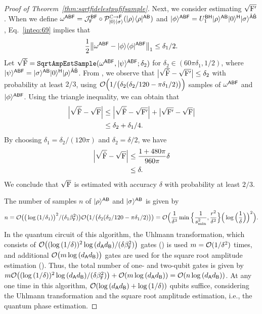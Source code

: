 \begin{proof}[Proof of Theorem~\ref{thm:sqrtfidelestpufifsample}]
Next, we consider estimating $\sqrt{{\mathrm{F}}'}$. When we define $\omega^{{\mathsf{A}}{\mathsf{B}}{\mathsf{F}}} = {\mathcal{J}}_{\mathtt{F}}^{{\mathsf{B}}{\mathsf{F}}}\circ{\mathcal{P}}_{|0\rangle|\sigma\rangle}^{\mathbb{C}\rightarrow{\mathsf{F}}}(|\rho\rangle\langle\rho|^{{\mathsf{A}}{\mathsf{B}}})$ and $|\phi\rangle^{{\mathsf{A}}{\mathsf{B}}{\mathsf{F}}} = U_1^{{\mathsf{B}}{\mathsf{H}}}|\rho\rangle^{{\mathsf{A}}{\mathsf{B}}}|0\rangle^{\mathsf{H}}|\sigma\rangle^{\hat{{\mathsf{A}}}\hat{{\mathsf{B}}}}$, Eq.~\eqref{inteq:69} implies that 
\begin{equation}
\label{eq:state error in FE}
    \frac{1}{2}\big\|\omega^{{\mathsf{A}}{\mathsf{B}}{\mathsf{F}}} - |\phi\rangle\langle\phi|^{{\mathsf{A}}{\mathsf{B}}{\mathsf{F}}}\big\|_1 \leq \delta_1/2. 
\end{equation} 
Let $\sqrt{\tilde{{\mathrm{F}}}} = \mathtt{SqrtAmpEstSample}(\omega^{{\mathsf{A}}{\mathsf{B}}{\mathsf{F}}}, |\psi\rangle^{{\mathsf{A}}{\mathsf{B}}{\mathsf{F}}}; \delta_2)$ for $\delta_2 \in (60\pi \delta_1, 1/2)$, where $|\psi\rangle^{{\mathsf{A}}{\mathsf{B}}{\mathsf{F}}} = |\sigma\rangle^{{\mathsf{A}}{\mathsf{B}}}|0\rangle^{\mathsf{H}}|\rho\rangle^{\hat{{\mathsf{A}}}\hat{{\mathsf{B}}}}$.
From , we observe that $\big|\sqrt{\tilde{{\mathrm{F}}}} - \sqrt{{\mathrm{F}}'}\big| \leq \delta_2$ with probability at least $2/3$, using ${\mathcal{O}}\Big(1/\big(\delta_2(\delta_2/120 - \pi \delta_1/2)\big)\Big)$ samples of $\omega^{{\mathsf{A}}{\mathsf{B}}{\mathsf{F}}}$ and $|\phi\rangle^{{\mathsf{A}}{\mathsf{B}}{\mathsf{F}}}$.
Using the triangle inequality, we can obtain that
\begin{align}
\label{inteq:72}
    \Big|\sqrt{\tilde{{\mathrm{F}}}} - \sqrt{{\mathrm{F}}}\Big| 
    &\leq \Big|\sqrt{\tilde{{\mathrm{F}}}} - \sqrt{{\mathrm{F}}'}\Big| + \big|\sqrt{{\mathrm{F}}'} - \sqrt{{\mathrm{F}}}\big| \\
    &\leq \delta_2 + \delta_1/4.
\end{align}
By choosing $\delta_1 = \delta_2/(120\pi)$ and $\delta_2 = \delta/2$, we have 
\begin{align}
    \Big|\sqrt{\tilde{{\mathrm{F}}}} - \sqrt{{\mathrm{F}}}\Big| 
    &\leq \frac{1 + 480\pi}{960\pi}\delta \\
    &\leq \delta.
\end{align}
We conclude that $\sqrt{{\mathrm{F}}}$ is estimated with accuracy $\delta$ with probability at least $2/3$.

The number of samples $n$ of $|\rho\rangle^{{\mathsf{A}}{\mathsf{B}}}$ and $|\sigma\rangle^{{\mathsf{A}}{\mathsf{B}}}$ is given by
\begin{align}
    n = {\mathcal{O}}\big(\big(\log{(1/\delta_1)}\big)^2/(\delta_1\beta_{\mathtt{F}}^2)\big){\mathcal{O}}\big(1/\big(\delta_2(\delta_2/120 - \pi \delta_1/2)\big)\big)   ={\mathcal{O}}\Big(\frac{1}{\delta^3}\min\Big\{\frac{1}{s_{\rm min}^2}, \frac{r^2}{\delta^2}\Big\}\Big(\log{\Big(\frac{1}{\delta}\Big)}\Big)^2\Big).
\end{align}
In the quantum circuit of this algorithm, the Uhlmann transformation, which consists of ${\mathcal{O}}\big((\log{(1/\delta)})^2\allowbreak\log{(d_{\mathsf{A}}d_{\mathsf{B}})}/(\delta\beta_{\mathtt{F}}^2)\big)$ gates () is used $m = {\mathcal{O}}(1/\delta^2)$ times, and additional ${\mathcal{O}}\big(m\log{(d_{\mathsf{A}}d_{\mathsf{B}})}\big)$ gates are used for the square root amplitude estimation (). Thus, the total number of one- and two-qubit gates is given by $m{\mathcal{O}}\big((\log{(1/\delta)})^2\log{(d_{\mathsf{A}}d_{\mathsf{B}})}/(\delta\beta_{\mathtt{F}}^2)\big) + {\mathcal{O}}(m\log{(d_{\mathsf{A}}d_{\mathsf{B}})}) = {\mathcal{O}}(n\log{(d_{\mathsf{A}}d_{\mathsf{B}})})$.
At any one time in this algorithm, ${\mathcal{O}}(\log{(d_{\mathsf{A}}d_{\mathsf{B}})} + \log{(1/\delta)})$ qubits suffice, considering the Uhlmann transformation and the square root amplitude estimation, i.e., the quantum phase estimation.




\end{proof}
